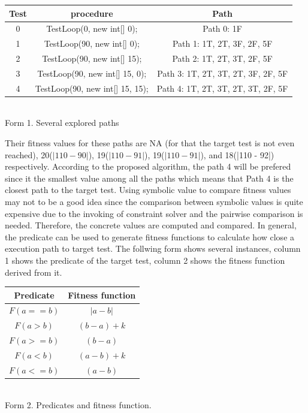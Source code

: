 \begin{center}
\begin{tabular}{|c|c|c|}\hline
Test & procedure & Path \\\hline
0 & TestLoop(0, new int[] {0}); & Path 0: 1F\\\hline
1 & TestLoop(90, new int[] {0}); & Path 1: 1T, 2T, 3F, 2F, 5F\\\hline
2 & TestLoop(90, new int[] {15}); &Path 2: 1T, 2T, 3T, 2F, 5F\\\hline
3 & TestLoop(90, new int[] {15, 0}); & Path 3: 1T, 2T, 3T, 2T, 3F, 2F, 5F\\\hline
4 & TestLoop(90, new int[] {15, 15});& Path 4: 1T, 2T, 3T, 2T, 3T, 2F, 5F\\\hline
\end{tabular}\\
Form 1. Several explored paths
\end{center}
Their fitness values for these paths are NA (for that the target test is not even reached), 20($|110 - 90|$), 19($|110 - 91|$), 19($|110 - 91|$), and 18(|110 - 92|) respectively. According to the proposed algorithm, the path 4 will be prefered since it the smallest value among all the paths which means that Path 4 is the closest path to the target test. Using symbolic value to compare fitness values may not to be a good idea since the comparison between symbolic values is quite expensive due to the invoking of constraint solver and the pairwise comparison is needed. Therefore, the concrete values are computed and compared. In general,  the predicate can be used to generate fitness functions to calculate how close a execution path to target test. The follwing form shows several instances, column 1 shows the predicate of the target test, column 2 shows the fitness function derived from it.\\
\begin{center}
\begin{tabular}{|c|c|}\hline
Predicate & Fitness function \\\hline
$F(a==b)$ & $|a-b|$ \\\hline
$F(a>b)$ & $(b-a)+k$ \\\hline
$F(a>=b)$ & $(b-a)$ \\\hline
$F(a<b)$ & $(a-b)+k$ \\\hline
$F(a<=b)$ & $(a-b)$ \\\hline
\end{tabular}\\
Form 2. Predicates and fitness function.
\end{center}
